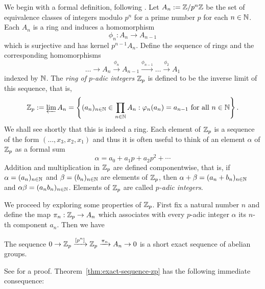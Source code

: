 We begin with a formal definition, following \cite{serre2012course}. Let \(A_n := \mathbb{Z}/p^n \mathbb{Z}\) be the set of equivalence classes of integers modulo \(p^n\) for a prime number \(p\) for each \(n \in \mathbb{N}\). Each \(A_n\) is a ring and induces a homomorphism\label{sec:padic-def}
\[
  \phi_n : A_{n} \to A_{n - 1}  
\]
which is surjective and has kernel \(p^{n-1}A_n\). Define the sequence of rings and the corresponding homomorphisms
\begin{equation*}
    \dots \to A_n \xrightarrow{\phi_n} A_{n - 1} \xrightarrow{\phi_{n - 1}} \dots \xrightarrow{\phi_2} A_1
\end{equation*}
indexed by \(\mathbb{N}\). The \emph{ring of \(p\)-adic integers} \(\mathbb{Z}_p\) is defined to be the inverse limit of this sequence, that is,
\[
  \mathbb{Z}_p := \varprojlim A_n = \left\{
    (a_n)_{n \in \mathbb{N}} \in \prod_{n \in \mathbb{N}} A_n : \varphi_n(a_n) = a_{n - 1} \text{ for all } n \in \mathbb{N}
  \right\}.
\]
We shall see shortly that this is indeed a ring. Each element of \(\mathbb{Z}_p\) is a sequence of the form \((\dots, x_3, x_2, x_1)\) and thus it is often useful to think of an element \(\alpha\) of \(\mathbb{Z}_p\) as a formal sum
\[
  \alpha = a_0 + a_1p + a_2p^2 + \cdots
\]
Addition and multiplication in \(\mathbb{Z}_p\) are defined componentwise, that is, if \(\alpha = (a_n)_{n \in \mathbb{N}}\) and \(\beta = (b_n)_{n \in \mathbb{N}}\) are elements of \(\mathbb{Z}_p\), then \(\alpha + \beta = (a_n + b_n)_{n \in \mathbb{N}}\) and \(\alpha\beta = (a_nb_n)_{n \in \mathbb{N}}\). Elements of \(\mathbb{Z}_p\) are called \emph{\(p\)-adic integers}.

We proceed by exploring some properties of \(\mathbb{Z}_p\). First fix a natural number \(n\) and define the map \(\pi_n: \mathbb{Z}_p \to A_n\) which associates with every \(p\)-adic integer \(\alpha\) its \(n\)-th component \(a_n\). Then we have
\begin{theoremx}\label{thm:exact-sequence-zp}
    The sequence \(0 \to \mathbb{Z}_p \xrightarrow{[p^n]} \mathbb{Z}_p \xrightarrow{\pi_n} A_n \to 0\) is a short exact sequence of abelian groups.
\end{theoremx}

See \cite[pp.~11--12]{serre2012course} for a proof. Theorem~\ref{thm:exact-sequence-zp} has the following immediate consequence:

